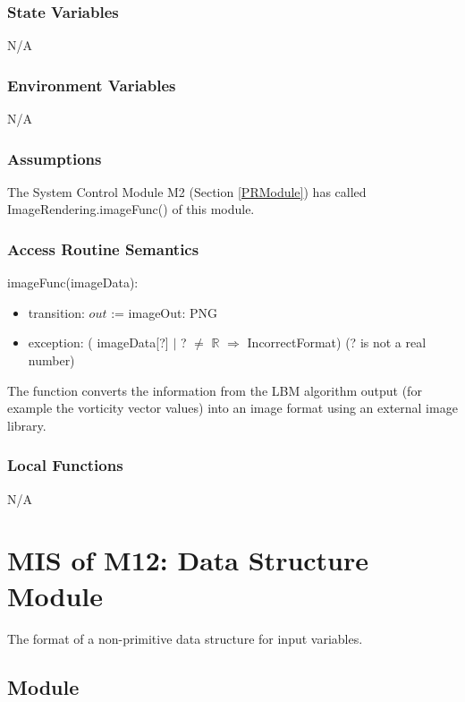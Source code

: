\documentclass[12pt, titlepage]{article}
\begin{document}
\subsubsection{State Variables}
N/A

\subsubsection{Environment Variables}
N/A 

\subsubsection{Assumptions}

The System Control Module M2 (Section \ref{PRModule}) has called ImageRendering.imageFunc() of this module.

\subsubsection{Access Routine Semantics}

\noindent imageFunc(imageData):
\begin{itemize}
	\item transition: $out$ := imageOut: PNG
	\item exception: ( imageData[?] $|$ ? $\neq$ $\mathbb{R}$ $\Rightarrow$ IncorrectFormat) (? is not a real number)
\end{itemize}

The function converts the information from the LBM algorithm output (for example the vorticity vector values) into an image format using an external image library.

\subsubsection{Local Functions}
N/A

\newpage

\section{MIS of M12: Data Structure Module} \label{DSModule} 

The format of a non-primitive data structure for input variables.

\subsection{Module}
\end{document}
